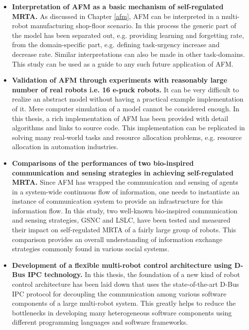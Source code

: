 \begin{itemize}
\item \textbf{Interpretation of AFM as a basic mechanism of self-regulated MRTA.} As discussed in Chapter \ref{afm}, AFM can be  interpreted in a multi-robot manufacturing shop-floor scenario.  In this process  the generic part of the model has been separated out, e.g. providing learning and forgetting rate, from the domain-specific part, e.g. defining task-urgency increase and decrease rate. Similar interpretations can also be made in other task-domains. This study can be used as a guide to any such future application of AFM.
%
\item \textbf{Validation of AFM through experiments with reasonably large number of real robots i.e. 16 e-puck robots.} It can be very difficult to realize an abstract model without having a practical example implementation of it. Mere computer simulation of a model cannot be considered enough. In this thesis,  a rich implementation of AFM  has been provided with detail algorithms and links to source code. This implementation can be replicated in solving many real-world tasks and resource allocation problems, e.g. resource allocation in automation industries.
%
\item \textbf{Comparisons of the performances of two bio-inspired communication and sensing strategies in achieving self-regulated MRTA.} Since AFM has wrapped the communication and sensing of agents  in a system-wide continuous flow of information, one needs to instantiate an instance of communication system to provide an infrastructure for this information flow. In this study,  two well-known bio-inspired  communication and sensing strategies, GSNC and LSLC, have been tested and measured their impact on self-regulated MRTA of a fairly large group of robots. This comparison provides an overall understanding of information exchange strategies commonly found in various social systems.
%
\item \textbf{Development of a flexible multi-robot control architecture using D-Bus IPC technology.} In this thesis,  the foundation of a new kind of robot control architecture has been laid down that uses the state-of-the-art D-Bus IPC protocol for decoupling the communication among various software components of a large multi-robot system. This greatly helps to reduce the bottlenecks in developing many heterogeneous software components using different programming languages and software frameworks.
%

\end{itemize}
